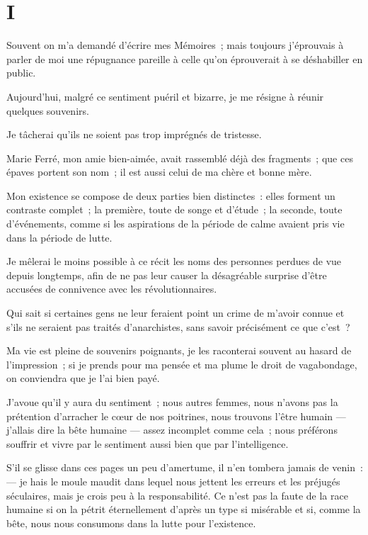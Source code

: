 \documentclass[french,twoside]{book} %
\newcommand\chapteropen{} %
\newcommand\chaptercont{} %
\begin{document}
\chapteropen
\chapter[{I}]{I}
\label{p1.1}

\chaptercont
\noindent Souvent on m’a demandé d’écrire mes Mémoires ; mais toujours j’éprouvais à parler de moi une répugnance pareille à celle qu’on éprouverait à se déshabiller en public.\par
Aujourd’hui, malgré ce sentiment puéril et bizarre, je me résigne à réunir quelques souvenirs.\par
Je tâcherai qu’ils ne soient pas trop imprégnés de tristesse.\par
Marie Ferré, mon amie bien-aimée, avait rassemblé déjà des fragments ; que ces épaves portent son nom ; il est aussi celui de ma chère et bonne mère.\par
 Mon existence se compose de deux parties bien distinctes : elles forment un contraste complet ; la première, toute de songe et d’étude ; la seconde, toute d’événements, comme si les aspirations de la période de calme avaient pris vie dans la période de lutte.\par
Je mêlerai le moins possible à ce récit les noms des personnes perdues de vue depuis longtemps, afin de ne pas leur causer la désagréable surprise d’être accusées de connivence avec les révolutionnaires.\par
Qui sait si certaines gens ne leur feraient point un crime de m’avoir connue et s’ils ne seraient pas traités d’anarchistes, sans savoir précisément ce que c’est ?\par
Ma vie est pleine de souvenirs poignants, je les raconterai souvent au hasard de l’impression ; si je prends pour ma pensée et ma plume le droit de vagabondage, on conviendra que je l’ai bien payé.\par
J’avoue qu’il y aura du sentiment ; nous autres femmes, nous n’avons pas la prétention d’arracher le cœur de nos poitrines, nous trouvons l’être humain — j’allais dire la bête humaine — assez incomplet comme cela ; nous préférons souffrir et vivre par le sentiment aussi bien que par l’intelligence.\par
 S’il se glisse dans ces pages un peu d’amertume, il n’en tombera jamais de venin : — je hais le moule maudit dans lequel nous jettent les erreurs et les préjugés séculaires, mais je crois peu à la responsabilité. Ce n’est pas la faute de la race humaine si on la pétrit éternellement d’après un type si misérable et si, comme la bête, nous nous consumons dans la lutte pour l’existence.\par
\end{document}
